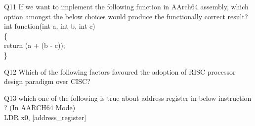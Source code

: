 \documentclass[a4paper]{article}
\begin{document}
{\begin{question}{Q11}   
   If we want to implement the following function in AArch64 assembly, which option amongst the below choices would produce the functionally correct result?
   \\
   int function(int a, int b, int c) \\
   \{ \\
		\hspace*{5 mm}     return (a + (b - c)); \\
   \} \\

  \begin{choices}
  \end{choices}
\end{question}


\begin{question}{Q12}   
  Which of the following factors favoured the adoption of RISC processor design paradigm over CISC?
  \begin{choices}
  \end{choices}
\end{question}



\begin{question}{Q13}   
   which one of the following is true about address register in below instruction ? (In AARCH64 Mode)  \\
   LDR x0, [address\_register] 
  \begin{choices}
  \end{choices}
\end{question}


}
\end{document}
